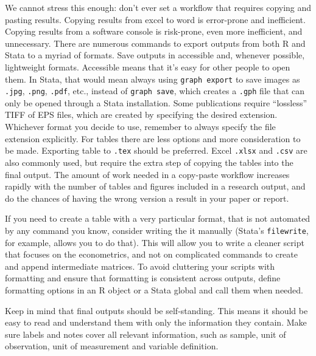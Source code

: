 We cannot stress this enough: 
don't ever set a workflow that requires copying and pasting results.
Copying results from excel to word is error-prone and inefficient.
Copying results from a software console is risk-prone, 
even more inefficient, and unnecessary.
There are numerous commands to export outputs from both R and Stata to a myriad of formats.
Save outputs in accessible and, whenever possible, lightweight formats.
Accessible means that it's easy for other people to open them.
In Stata, that would mean always using \texttt{graph export} to save images as 
\texttt{.jpg}, \texttt{.png}, \texttt{.pdf}, etc., 
instead of \texttt{graph save}, 
which creates a \texttt{.gph} file that can only be opened through a Stata installation.
Some publications require ``lossless'' TIFF of EPS files, which are created by specifying the desired extension.
Whichever format you decide to use, remember to always specify the file extension explicitly.
For tables there are less options and more consideration to be made.
Exporting table to \texttt{.tex} should be preferred. 
Excel \texttt{.xlsx} and \texttt{.csv} are also commonly used, 
but require the extra step of copying the tables into the final output.
The amount of work needed in a copy-paste workflow increases rapidly with the number of tables and figures included in a research output, 
and do the chances of having the wrong version a result in your paper or report.

If you need to create a table with a very particular format, 
that is not automated by any command you know, consider writing the it manually 
(Stata's \texttt{filewrite}, for example, allows you to do that).
This will allow you to write a cleaner script that focuses on the econometrics, 
and not on complicated commands to create and append intermediate matrices.
To avoid cluttering your scripts with formatting and ensure that formatting is consistent across outputs,
define formatting options in an R object or a Stata global and call them when needed.

Keep in mind that final outputs should be self-standing.
This means it should be easy to read and understand them with only the information they contain.
Make sure labels and notes cover all relevant information, such as sample, 
unit of observation, unit of measurement and variable definition.

